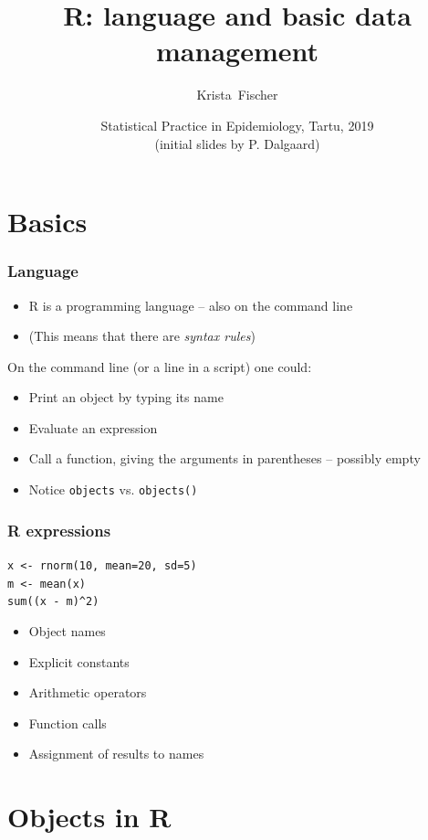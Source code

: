 \documentclass{beamer}
\title{R: language and basic data management}
\author{Krista~Fischer}
\date[Tartu 2019] %
{Statistical Practice in Epidemiology, Tartu, 2019 \\ (initial slides by P. Dalgaard)}
\newcommand{\code}[1]{\texttt{#1}}
\begin{document}
\begin{frame}
  \titlepage
\end{frame}

\section{Basics}

\begin{frame}
  \frametitle{Language}
  \begin{itemize}
  \item R is a programming language -- also on the command line
  \item (This means that there are \emph{syntax rules})
  \end{itemize}
On the command line (or a line in a script) one could:
  \begin{itemize}
  \item Print an object by typing its name
  \item Evaluate an expression 
  \item Call a function, giving the arguments in parentheses -- possibly empty
  \item Notice \code{objects} vs. \code{objects()}
  \end{itemize}
\end{frame}


\begin{frame}
  \frametitle{R expressions}
\texttt{\alert<6>{\alert<2>{x} <-} \alert<5>{rnorm(\alert<3>{10}, mean=\alert<3>{20}, 
 sd=\alert<3>{5})}\\
\alert<6>{\alert<2>{m} <-} \alert<5>{mean(\alert<2>{x})}\\
\alert<5>{sum((\alert<2>{x} \alert<4>{-} \alert<2>{m})\alert<4>{\textasciicircum}\alert<3>{2})}
}\\
\pause
  \begin{itemize}
  \item Object \alert<2>{names}
  \item Explicit \alert<3>{constants}
  \item Arithmetic \alert<4>{operators}
  \item \alert<5>{Function calls}
  \item \alert<6>{Assignment} of results to names
  \end{itemize}
\end{frame}

\section{Objects in R}
\end{document}
